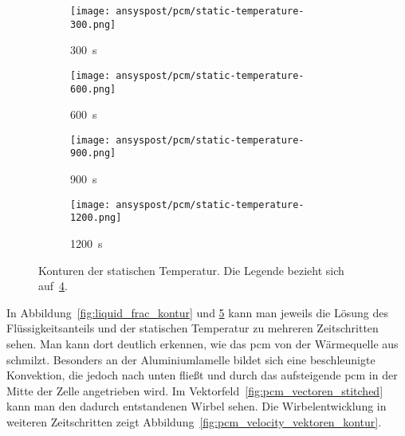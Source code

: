\begin{figure}
\begin{minipage}[t]{0.485\textwidth}
\begin{subfigure}[t]{0.16\textwidth}
        \end{subfigure}%
        \hspace{2mm}%
        \begin{subfigure}[t]{0.2\textwidth}
            \centering
            \texttt{[image: ansyspost/pcm/static-temperature-300.png]}
            \caption{\SI{300}{\second}}\label{fig:temperatur_300}
        \end{subfigure}%
        \begin{subfigure}[t]{0.2\textwidth}
            \centering
            \texttt{[image: ansyspost/pcm/static-temperature-600.png]}
            \caption{\SI{600}{\second}}\label{fig:temperatur_600}
        \end{subfigure}%
        \begin{subfigure}[t]{0.2\textwidth}
            \centering
            \texttt{[image: ansyspost/pcm/static-temperature-900.png]}
            \caption{\SI{900}{\second}}\label{fig:temperatur_900}
        \end{subfigure}%
        \begin{subfigure}[t]{0.2\textwidth}
            \centering
            \texttt{[image: ansyspost/pcm/static-temperature-1200.png]}
            \caption{\SI{1200}{\second}}\label{fig:temperatur_1200}
        \end{subfigure}
        \caption{Konturen der statischen Temperatur. Die Legende bezieht sich auf~\ref{fig:temperatur_1200}.}
        \label{fig:static_temperature_kontur}
    \end{minipage}

\end{figure}

In Abbildung~\ref{fig:liquid_frac_kontur} und \ref{fig:static_temperature_kontur} kann man jeweils die Lösung des Flüssigkeitsanteils
und der statischen Temperatur zu mehreren Zeitschritten sehen. Man kann dort deutlich erkennen, wie das \ac{pcm} von der Wärmequelle aus
schmilzt. Besonders an der Aluminiumlamelle bildet sich eine beschleunigte Konvektion, die jedoch nach unten fließt und durch das aufsteigende
\ac{pcm} in der Mitte der Zelle angetrieben wird. Im Vektorfeld~\ref{fig:pcm_vectoren_stitched} kann man den dadurch entstandenen Wirbel sehen.
Die Wirbelentwicklung in weiteren Zeitschritten zeigt Abbildung~\ref{fig:pcm_velocity_vektoren_kontur}.


